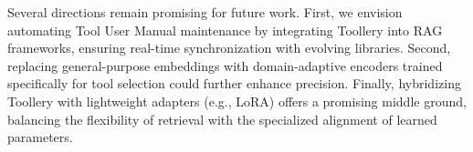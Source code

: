 \documentclass[11pt]{article}
\begin{document}

Several directions remain promising for future work. First, we envision automating Tool User Manual maintenance by integrating Toollery into RAG frameworks, ensuring real-time synchronization with evolving libraries. Second, replacing general-purpose embeddings with domain-adaptive encoders trained specifically for tool selection could further enhance precision. Finally, hybridizing Toollery with lightweight adapters (e.g., LoRA) offers a promising middle ground, balancing the flexibility of retrieval with the specialized alignment of learned parameters.

\clearpage
\newpage

\end{document}
